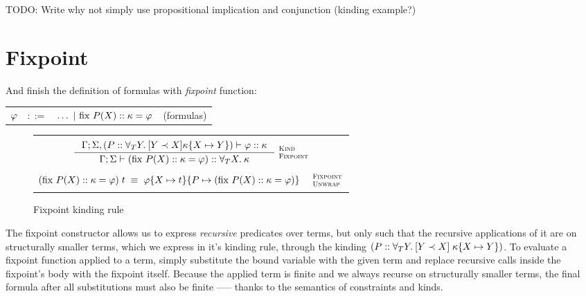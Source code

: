 \documentclass[english, mgr]{iithesis}
\renewcommand{\it}[1]{\textit{#1}}
\newcommand{\fix}[3]{\ensuremath{\text{fix }#1(#2)\ofkind#3=}}\newcommand{\myatop}[2]{\ensuremath{\genfrac{}{}{0pt}{}{#1\hfill}{#2\hfill}}}
\newcommand{\scbrk}[2]{\myatop{\textsc{#1}}{\textsc{#2}}}
\begin{document}
TODO: Write why not simply use propositional implication and conjunction (kinding example?)

\section{Fixpoint}
And finish the definition of formulas with \it{fixpoint} function:
\\
\begin{tabular}{rrlr}
$\varphi$ & $::=$ & $\ldots
               \bnfor \fix{\propv}{\termv}{\kind}{\formphi} $
    & (formulas)
\end{tabular}

\begin{figure}[htpb]
  \begin{tabularx}{\textwidth}{|C|}
    \hline \\ $
\inference{
  \cEnv;\kEnv, (\propv \ofkind \kForallTerm{Y} \kGuard{Y \cshlt \termv}{\kind\subst{\termv}{Y}})\vdash \formphi \ofkind \kind
}{
  \cEnv;\kEnv\vdash (\fix{\propv}{\termv}{\kind}{\formphi}) \ofkind \kForallTerm{\termv}{\kind}
}\:\scbrk{Kind}{Fixpoint}
  $ \\ \\
  $
(\fix{\propv}{\termv}{\kind}{\formphi})\fApp\term
\;\equiv\;
\formphi\subst{\termv}{\term}\subst{\propv}{(\fix{\propv}{\termv}{\kind}{\formphi})}
\quad\:\scbrk{Fixpoint}{Unwrap}$
  \\ \\ \hline
\end{tabularx}
  \caption{Fixpoint kinding rule}
  \label{fig:fixpoint-kinding}
\end{figure}
The fixpoint constructor allows us to express \it{recursive} predicates over terms,
but only such that the recursive applications of it are on structurally smaller terms,
which we express in it's kinding rule, through the kinding $(P :: \forall_T Y .\: [Y \prec X]{\;\kappa\{X\mapsto Y\}})$.
To evaluate a fixpoint function applied to a term, simply substitute the bound
variable with the given term and replace recursive calls inside the fixpoint's body with the fixpoint itself.
Because the applied term is finite
and we always recurse on structurally smaller terms,
the final formula after all substitutions must also be finite
--— thanks to the semantics of constraints and kinds.
\end{document}
